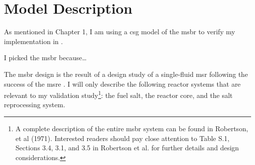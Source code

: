 \chapter{Model Description}
\label{ch:chapter4}
As mentioned in Chapter 1, I am using a \Gls{csg} model of the \Gls{msbr}
\cite{robertson_conceptual_1971} to verify my \OpenMC implementation in
\SaltProc.

I picked the \Gls{msbr} because\ldots 

The \Gls{msbr} design is the result of a design study of a single-fluid
\Gls{msr} following the success of the \Gls{msre}
\cite{haubenreich_experience_1970}\cite{rosenthal_molten-salt_1970}.
I will only describe the following reactor systems that are relevant to
my validation study\footnote{A complete description of the entire \Gls{msbr}
system can be found in Robertson, et al (1971)\cite{robertson_conceptual_1971}.
Interested readers should pay close attention to Table S.1, Sections 3.4, 3.1,
and 3.5 in Robertson et al. for further details and design considerations.}:
the fuel salt, the reactor core, and the salt reprocessing system.

